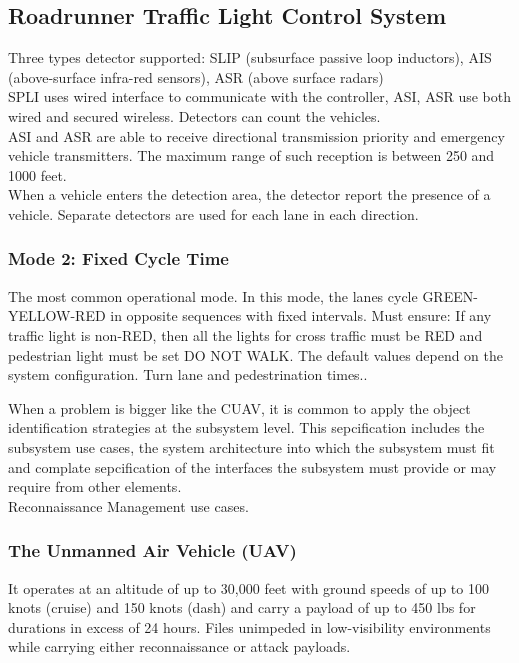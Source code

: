 \documentclass[12pt,a4paper]{article}
\begin{document}
\subsection{Roadrunner Traffic Light Control System}
Three types detector supported: SLIP (subsurface passive loop inductors), AIS (above-surface infra-red sensors), ASR (above surface radars) \\
SPLI uses wired interface to communicate with the controller, ASI, ASR use both wired and secured wireless. Detectors can count the vehicles.\\
ASI and ASR are able to receive directional transmission priority and emergency vehicle transmitters. The maximum range of such reception is between 250 and 1000 feet. \\
When a vehicle enters the detection area, the detector report the presence of a vehicle. Separate detectors are used for each lane in each direction.

\subsubsection{Mode 2: Fixed Cycle Time}
The most common operational mode. In this mode, the lanes cycle GREEN-YELLOW-RED in opposite sequences with fixed intervals. Must ensure: If any traffic light is non-RED, then all the lights for cross traffic must be RED and pedestrian light must be set DO NOT WALK. The default values depend on the system configuration. Turn lane and pedestrination times..

When a problem is bigger like the CUAV, it is common to apply the object identification strategies at the subsystem level. This sepcification includes the subsystem use cases, the system architecture into which the subsystem must fit and complate sepcification of the interfaces the subsystem must provide or may require from other elements. \\

Reconnaissance Management use cases.

\subsubsection{The Unmanned Air Vehicle (UAV)}
It operates at an altitude of up to 30,000
feet with ground speeds of up to 100 knots (cruise) and 150 knots (dash) and carry a payload of up to 450 lbs for durations in excess of 24 hours. Files unimpeded in low-visibility environments
while carrying either reconnaissance or attack payloads.
\end{document}
